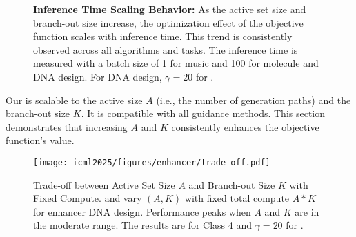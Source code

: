 \begin{figure*}
    \centering
    \hspace{0.005\linewidth}
    \hspace{0.005\linewidth}
    \hspace{0.005\linewidth}
    \caption{\textbf{Inference Time Scaling Behavior:} As the active set size and branch-out size increase, the optimization effect of the objective function scales with inference time. This trend is consistently observed across all algorithms and tasks. The inference time is measured with a batch size of 1 for music and 100 for molecule and DNA design. For DNA design, $\gamma=20$ for \xtgrad.}
    \label{fig:scaling law}
\end{figure*}













Our \ouralg is scalable to the active size $A$ (i.e., the number of generation paths) and the branch-out size $K$. It is compatible with all guidance methods. This section demonstrates that increasing $A$ and $K$ consistently enhances the objective function's value.


\begin{figure}[ht]
    \centering
    \texttt{[image: icml2025/figures/enhancer/trade\_off.pdf]}
     \caption{ Trade-off between Active Set Size $A$ and Branch-out Size $K$ with Fixed Compute. \xtsampling and \xtgrad vary $(A, K)$ with fixed total compute $A*K$ for enhancer DNA design.  Performance peaks when $A$ and $K$ are in the moderate range. The results are for Class 4 and $\gamma=20$ for \xtgrad. }
    \label{fig:trade-off A K}
\end{figure}





